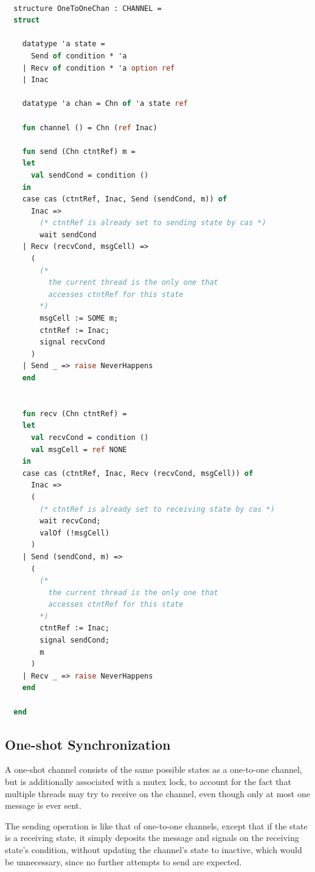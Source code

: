 \documentclass[letterpaper, 11pt]{report}
\begin{document}
\begin{lstlisting}[language=ML, mathescape]

  structure OneToOneChan : CHANNEL =
  struct

    datatype 'a state =
      Send of condition * 'a
    | Recv of condition * 'a option ref
    | Inac  

    datatype 'a chan = Chn of 'a state ref

    fun channel () = Chn (ref Inac)

    fun send (Chn ctntRef) m =
    let
      val sendCond = condition ()
    in
    case cas (ctntRef, Inac, Send (sendCond, m)) of
      Inac => 
        (* ctntRef is already set to sending state by cas *)
        wait sendCond
    | Recv (recvCond, msgCell) =>
      (
        (*
          the current thread is the only one that
          accesses ctntRef for this state
        *)
        msgCell := SOME m;
        ctntRef := Inac;
        signal recvCond
      )
    | Send _ => raise NeverHappens
    end


    fun recv (Chn ctntRef) =
    let
      val recvCond = condition ()
      val msgCell = ref NONE 
    in
    case cas (ctntRef, Inac, Recv (recvCond, msgCell)) of
      Inac =>
      (
        (* ctntRef is already set to receiving state by cas *)
        wait recvCond;
        valOf (!msgCell)
      )
    | Send (sendCond, m) =>
      (
        (*
          the current thread is the only one that
          accesses ctntRef for this state
        *)
        ctntRef := Inac;
        signal sendCond;
        m
      )
    | Recv _ => raise NeverHappens
    end 

  end
\end{lstlisting}

\subsection{One-shot Synchronization}

A one-shot channel consists of the same possible states as a one-to-one channel, but is
additionally associated with a mutex lock, to account for the fact that multiple threads may
try to receive on the channel, even though only at most one message is ever sent.

The sending operation is like that of one-to-one channels,
except that if the state is a receiving state, it simply deposits the message and signals
on the receiving state's condition,
without updating the channel's state to inactive, which would be unnecessary, since
no further attempts to send are expected.
\end{document}
